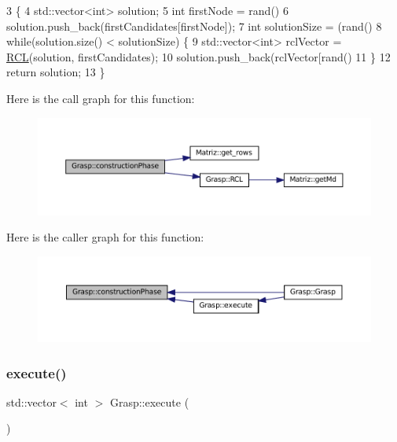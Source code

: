 \begin{DoxyCode}
3                                                                        \{
4    std::vector<int> solution;
5    \textcolor{keywordtype}{int} firstNode = rand() %
6    solution.push\_back(firstCandidates[firstNode]);
7    \textcolor{keywordtype}{int} solutionSize = (rand() %
8    \textcolor{keywordflow}{while}(solution.size() < solutionSize) \{
9      std::vector<int> rclVector = \hyperlink{classGrasp_ac63d4a1892472663549c77686edfed74}{RCL}(solution, firstCandidates);
10      solution.push\_back(rclVector[rand() %
11    \}
12    \textcolor{keywordflow}{return} solution;
13  \}
\end{DoxyCode}
Here is the call graph for this function\+:\nopagebreak
\begin{figure}[H]
\begin{center}
\leavevmode
\includegraphics[width=350pt]{classGrasp_aef091e71dd747ebcb78e1ebcdcf44221_cgraph}
\end{center}
\end{figure}
Here is the caller graph for this function\+:\nopagebreak
\begin{figure}[H]
\begin{center}
\leavevmode
\includegraphics[width=350pt]{classGrasp_aef091e71dd747ebcb78e1ebcdcf44221_icgraph}
\end{center}
\end{figure}
\mbox{\label{classGrasp_a335b063bccd26b434dda3a3a69d6d711}} 
\subsubsection{\texorpdfstring{execute()}{execute()}}
{\footnotesize\ttfamily std\+::vector$<$ int $>$ Grasp\+::execute (\begin{DoxyParamCaption}{ }\end{DoxyParamCaption})\hspace{0.3cm}{\ttfamily [virtual]}}



